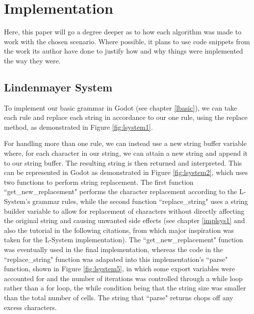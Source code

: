 \chapter{Implementation} \label{Implementation}


Here, this paper will go a degree deeper as to how each algorithm was made to work with the chosen scenario. Where possible, it plans to use code snippets from the work its author have done to justify how and why things were implemented the way they were.

\section{Lindenmayer System} \label{implsys2}

To implement our basic grammar in Godot (see chapter \ref{lbasic}), we can take each rule and replace each string in accordance to our one rule, using the replace method, as demonstrated in Figure \ref{fig:lsystem1}.

For handling more than one rule, we can instead use a new string buffer variable where, for each character in our string, we can attain a new string and append it to our string buffer. The resulting string is then returned and interpreted. This can be represented in Godot as demonstrated in Figure \ref{fig:lsystem2}, which uses two functions to perform string replacement. The first function ``get\_new\_replacement" performs the character replacement according to the L-System's grammar rules, while the second function ``replace\_string" uses a string builder variable to allow for replacement of characters without directly affecting the original string and causing unwanted side effects (see chapter \ref{implsys1} and also the tutorial in the following citations\cite{codatGD3LSystemYT}\cite{codatGD3LSystemGH}\cite{codatGD4LSystemGH}, from which major inspiration was taken for the L-System implementation). The ``get\_new\_replacement" function was eventually used in the final implementation, whereas the code in the ``replace\_string" function was adapated into this implementation's ``parse" function, shown in Figure \ref{fig:lsystem5}, in which some export variables were accounted for and the number of iterations was controlled through a while loop rather than a for loop, the while condition being that the string size was smaller than the total number of cells. The string that ``parse" returns chops off any excess characters.

